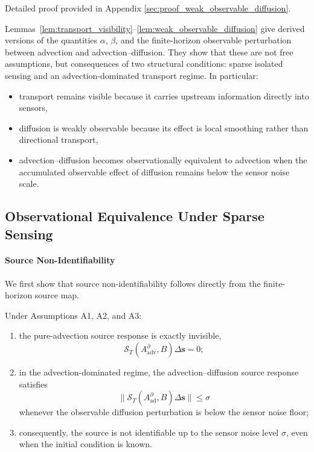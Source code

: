 Detailed proof provided in Appendix \ref{sec:proof_weak_observable_diffusion}.

Lemmas~\ref{lem:transport_visibility}--\ref{lem:weak_observable_diffusion} give derived versions of the quantities $\alpha$, $\beta$, and the finite-horizon observable perturbation between advection and advection--diffusion. They show that these are not free assumptions, but consequences of two structural conditions: sparse isolated sensing and an advection-dominated transport regime. In particular:
\begin{itemize}[itemsep=0pt,topsep=0pt,leftmargin=*]
    \item transport remains visible because it carries upstream information directly into sensors,
    \item diffusion is weakly observable because its effect is local smoothing rather than directional transport,
    \item advection--diffusion becomes observationally equivalent to advection when the accumulated observable effect of diffusion remains below the sensor noise scale.
\end{itemize}


\subsection{Observational Equivalence Under Sparse Sensing}
\paragraph{Source Non-Identifiability}

We first show that source non-identifiability follows directly from the finite-horizon source map.

\begin{proposition}
\label{prop:source_nonidentifiable}
Under Assumptions A1, A2, and A3:
\begin{enumerate}[leftmargin=*]
    \item the pure-advection source response is exactly invisible,
    \begin{equation}
    \mathcal{S}_T(A_{\mathrm{adv}}^{\partial},B)\Delta \mathbf{s} = 0;
    \label{eq:adv_source_zero}
    \end{equation}
    \item in the advection-dominated regime, the advection--diffusion source response satisfies
    \begin{equation}
    \|\mathcal{S}_T(A_{\mathrm{ad}}^{\partial},B)\Delta \mathbf{s}\|
    \le \sigma
    \label{eq:source_below_noise_prop}
    \end{equation}
    whenever the observable diffusion perturbation is below the sensor noise floor;
    \item consequently, the source is not identifiable up to the sensor noise level $\sigma$, even when the initial condition is known.
\end{enumerate}
\end{proposition}



